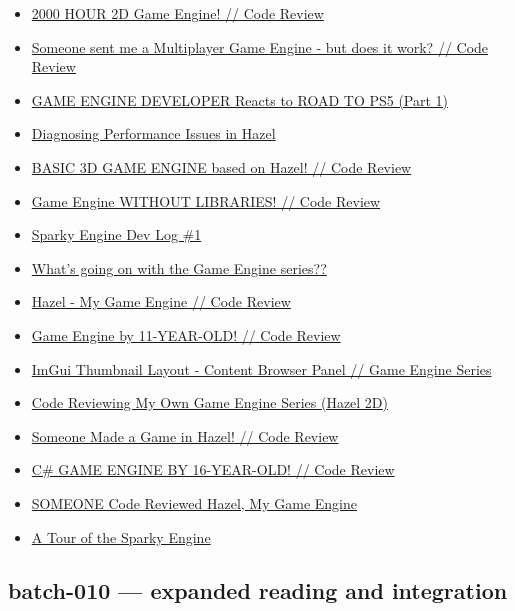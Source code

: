 \begin{itemize}
\item
  \href{https://www.youtube.com/watch?v=5b95WTHZ9HE}{2000 HOUR 2D Game Engine! // Code Review}
\item
  \href{https://www.youtube.com/watch?v=lAXOmE481j4}{Someone sent me a Multiplayer Game Engine - but does it work? // Code Review}
\item
  \href{https://www.youtube.com/watch?v=erxUR9SI4F0}{GAME ENGINE DEVELOPER Reacts to ROAD TO PS5 (Part 1)}
\item
  \href{https://www.youtube.com/watch?v=iY6QbL_3L2I}{Diagnosing Performance Issues in Hazel}
\item
  \href{https://www.youtube.com/watch?v=sIAXLH7ZqCw}{BASIC 3D GAME ENGINE based on Hazel! // Code Review}
\item
  \href{https://www.youtube.com/watch?v=v_BmwKl9Inc}{Game Engine WITHOUT LIBRARIES! // Code Review}
\item
  \href{https://www.youtube.com/watch?v=dXAIiCUrSv4}{Sparky Engine Dev Log \#1}
\item
  \href{https://www.youtube.com/watch?v=lwDdMYzUnxs}{What's going on with the Game Engine series??}
\item
  \href{https://www.youtube.com/watch?v=1W1FtRaY69Y}{Hazel - My Game Engine // Code Review}
\item
  \href{https://www.youtube.com/watch?v=dBlQv5GEBDc}{Game Engine by 11-YEAR-OLD! // Code Review}
\item
  \href{https://www.youtube.com/watch?v=uQljBVVb-lU}{ImGui Thumbnail Layout - Content Browser Panel // Game Engine Series}
\item
  \href{https://www.youtube.com/watch?v=aWGVjFTbXc8}{Code Reviewing My Own Game Engine Series (Hazel 2D)}
\item
  \href{https://www.youtube.com/watch?v=WOnMkazhP5I}{Someone Made a Game in Hazel! // Code Review}
\item
  \href{https://www.youtube.com/watch?v=kQc2BUjORhs}{C\# GAME ENGINE BY 16-YEAR-OLD! // Code Review}
\item
  \href{https://www.youtube.com/watch?v=Glq1oDBy1cQ}{SOMEONE Code Reviewed Hazel, My Game Engine}
\item
  \href{https://www.youtube.com/watch?v=32PRB7Tebbo}{A Tour of the Sparky Engine}
\end{itemize}

\subsection{batch-010 --- expanded reading and integration}\label{batch-010-expanded-reading-and-integration}

